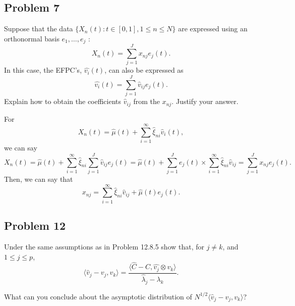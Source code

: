 \documentclass{article}
\theoremstyle{definition}
\numberwithin{equation}{section}
\begin{document}
\subsection{Problem 7}

\begin{problem}
Suppose that the data $\{ X_{n}(t) : t \in [0,1], 1 \leq n \leq N \}$ are expressed using an orthonormal basis $e_{1}, \ldots, e_{j}$ : 
$$
X_{n}(t) = \sum_{j=1}^{J} x_{nj}e_{j}(t).
$$
In this case, the EFPC's, $\hat{v_{i}}(t)$, can also be expressed as 
$$
\hat{v_{i}}(t) = \sum_{j=1}^{J} \hat{v}_{ij}e_{j}(t).
$$
Explain how to obtain the coefficients $\hat{v}_{ij}$ from the $x_{nj}$. Justify your answer.
\end{problem}

\begin{mysol}
For 
$$
X_{n}(t) = \hat{\mu}(t) + \sum_{i=1}^{\infty} \hat{\xi}_{ni} \hat{v}_{i}(t),
$$
we can say
$$
X_{n}(t)
= \hat{\mu}(t) + \sum_{i=1}^{\infty} \hat{\xi}_{ni} \sum_{j=1}^{J} \hat{v}_{ij}e_{j}(t)
= \hat{\mu}(t) + \sum_{j=1}^{J} e_{j}(t) \times \sum_{i=1}^{\infty} \hat{\xi}_{ni}\hat{v}_{ij}
= \sum_{j=1}^{J} x_{nj}e_{j}(t).
$$
Then, we can say that
$$
x_{nj} = \sum_{i=1}^{\infty} \hat{\xi}_{ni}\hat{v}_{ij} + \hat{\mu}(t) e_{j}(t).
$$


\end{mysol}

\subsection{Problem 12}

\begin{problem}
Under the same assumptions as in Problem 12.8.5 show that, for $j \neq k$, and $1 \leq j \leq p$,
$$
\langle \hat{v}_{j} - v_{j}, v_{k} \rangle = \frac{\langle \hat{C} - C, \hat{v_{j}} \otimes v_{k} \rangle }{\hat{\lambda}_{j} - \lambda_{k}}.
$$
\end{problem}
What can you conclude about the asymptotic distribution of $N^{1/2}\langle \hat{v}_{j} - v_{j}, v_{k} \rangle $?


\begin{mysol}

\end{mysol}


\end{document}
